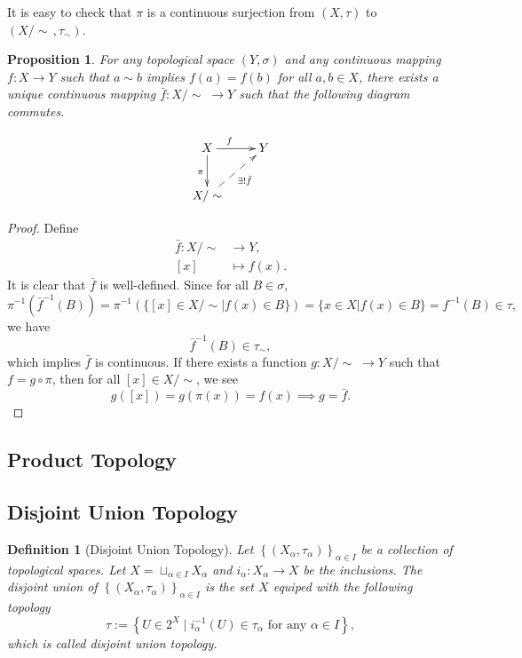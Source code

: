 \documentclass{report}
\newtheorem{definition}{Definition}[section]
\newtheorem{proposition}{Proposition}[section]
\theoremstyle{nonumberplain}
\newtheorem{proof}{Proof.}
\begin{document}
It is easy to check that $\pi$ is a continuous surjection from $(X,\tau)$ to $(X/\sim\,,\tau_\sim)$.

\begin{proposition}
	For any topological space $(Y,\sigma)$ and any continuous mapping $f:X\to Y$ such that $a\sim b$ implies $f(a) = f(b)$ for all $a,b \in X$, there exists a unique continuous mapping $\bar{f}:X/\sim\;\to Y$ such that the following diagram commutes.

	\[\xymatrix{
		X\ar[r]^{f\quad}\ar[d]_{\pi}  &Y\\
		X/\sim\ar@{-->}[ru]_{\exists!\bar{f}}&
		}\]
\end{proposition}


\begin{proof}
	Define
	\begin{align*}
		\bar{f}:X/\sim & \longrightarrow Y, \\
		[x]            & \longmapsto f(x).
	\end{align*}
	It is clear that $\bar{f}$ is well-defined. Since for all $B\in \sigma$,
	\[
		\pi^{-1}\left(\bar{f}^{-1}(B)\right)=\pi^{-1}\left(\{[x]\in X/\sim| f(x)\in B\}\right)=\{x\in X| f(x)\in B\}=f^{-1}(B)\in \tau,
	\]
	we have
	\[
		\bar{f}^{-1}(B)\in \tau_\sim,
	\]
	which implies $\bar{f}$ is continuous. If there exists a function $g:X/\sim\;\to Y$ such that $f=g\circ\pi$, then for all $[x]\in X/\sim$, we see
	\[
		g([x])=g(\pi(x))=f(x)\implies g=\bar{f}.
	\]
\end{proof}


\subsection{Product Topology}

\subsection{Disjoint Union Topology}
\begin{definition}[Disjoint Union Topology]
	Let $\left\{(X_\alpha,\tau_\alpha)\right\}_{\alpha\in I}$ be a collection of topological spaces. Let $X=\sqcup_{\alpha\in I}X_\alpha$ and $i_\alpha:X_\alpha\to X$ be the inclusions. The \emph{disjoint union} of $\left\{(X_\alpha,\tau_\alpha)\right\}_{\alpha\in I}$ is the set $X$ equiped with the following topology
	\[
		\tau:=\left\{U\in 2^{X}\mid i_{\alpha}^{-1}(U)\in \tau_\alpha\text{ for any }\alpha\in I\right\},
	\]
	which is called \emph{disjoint union topology}. 
\end{definition}
\end{document}
